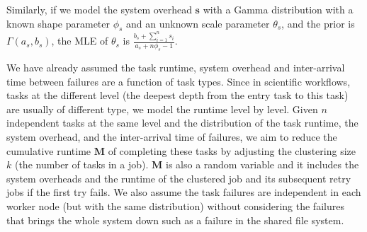 \documentclass{IOS-Book-Article}
\begin{document}
Similarly, if we model the system overhead $\bm s$ with a Gamma distribution with a known shape parameter $\phi_{s}$ and an unknown scale parameter $\theta_s$, and the prior is $\Gamma(a_s, b_s)$, the MLE of $\theta_s$ is $\displaystyle\frac{b_s+\displaystyle\sum_{i=1}^n{s_i}}{a_s+n\phi_s-1}$.

We have already assumed the task runtime, system overhead and inter-arrival time between failures are a function of task types. Since in scientific workflows, tasks at the different level (the deepest depth from the entry task to this task) are usually of different type, we model the runtime level by level. Given $n$ independent tasks at the same level and the distribution of the task runtime, the system overhead, and the inter-arrival time of failures, we aim to reduce the cumulative runtime $\bm M$ of completing these tasks by adjusting the clustering size $k$ (the number of tasks in a job). 
$\bm M$ is also a random variable and it includes the system overheads and the runtime of the clustered job and its subsequent retry jobs if the first try fails. We also assume the task failures are independent in each worker node (but with the same distribution) without considering the failures that brings the whole system down such as a failure in the shared file system. 
\end{document}
